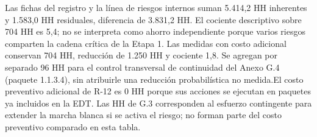 \documentclass[anexo]{../../comun/overfore}
\begin{document}
Las fichas del registro y la línea de riesgos internos suman 5.414,2 HH inherentes y 1.583,0 HH residuales, diferencia de 3.831,2 HH. El cociente descriptivo sobre 704 HH es 5,4; no se interpreta como ahorro independiente porque varios riesgos comparten la cadena crítica de la Etapa 1. Las medidas con costo adicional conservan 704 HH, reducción de 1.250 HH y cociente 1,8. Se agregan por separado 96 HH para el control transversal de continuidad del Anexo G.4 (paquete 1.1.3.4), sin atribuirle una reducción probabilística no medida.\newline El costo preventivo adicional de R-12 es 0 HH porque sus acciones se ejecutan en paquetes ya incluidos en la EDT. Las HH de G.3 corresponden al esfuerzo contingente para extender la marcha blanca si se activa el riesgo; no forman parte del costo preventivo comparado en esta tabla.
\end{document}
